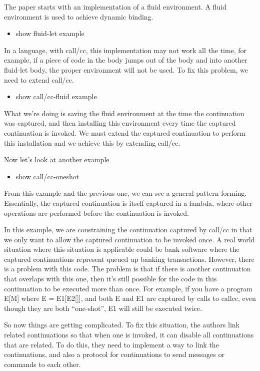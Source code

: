 \documentclass[letterpaper]{llncs}
\begin{document}
The paper starts with an implementation of a fluid environment. A fluid environment is used to achieve dynamic binding.

\begin{itemize}
	\item show fluid-let example
\end{itemize}

In a language, with call/cc, this implementation may not work all the time, for example, if a piece of code in the body jumps out of the body and into another fluid-let body, the proper environment will not be used. To fix this problem, we need to extend call/cc.

\begin{itemize}
	\item show call/cc-fluid example
\end{itemize}

What we're doing is saving the fluid environment at the time the continuation was captured, and then installing this environment every time the captured continuation is invoked. We must extend the captured continuation to perform this installation and we achieve this by extending call/cc.

Now let's look at another example

\begin{itemize}
	\item show call/cc-oneshot
\end{itemize}


From this example and the previous one, we can see a general pattern forming. Essentially, the captured continuation is itself captured in a lambda, where other operations are performed before the continuation is invoked.

In this example, we are constraining the continuation captured by call/cc in that we only want to allow the captured continuation to be invoked once. A real world situation where this situation is applicable could be bank software where the captured continuations represent queued up banking transactions. However, there is a problem with this code. The problem is that if there is another continuation that overlaps with this one, then it's still possible for the code in this continuation to be executed more than once. For example, if you have a program E[M] where E = E1[E2[]], and both E and E1 are captured by calls to callcc, even though they are both ``one-shot'', E1 will still be executed twice.

So now things are getting complicated. To fix this situation, the authors link related continuations so that when one is invoked, it can disable all continuations that are related. To do this, they need to implement a way to link the continuations, and also a protocol for continuations to send messages or commands to each other.
\end{document}
